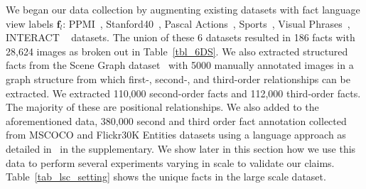 \documentclass[runningheads]{llncs}
\begin{document}
We began our data collection by augmenting existing datasets with fact language view labels $\mathbf{f}_l$: PPMI~\cite{yao2010grouplet}, Stanford40~\cite{yao2011human}, Pascal Actions~\cite{pascal_voc_2012}, Sports~\cite{abhinavg09}, Visual Phrases~\cite{sadeghi2011recognition}, INTERACT ~\cite{antol2014zero} datasets. The union of these 6 datasets resulted in 186 facts with 28,624 images as broken out in Table~\ref{tbl_6DS}. 
We also extracted structured facts from the Scene Graph dataset~\cite{johnson2015image} with 5000 manually annotated images in a graph structure from which first-, second-, and third-order relationships can be extracted. We extracted 110,000 second-order facts and 112,000 third-order facts.  The majority of these are positional relationships. We also added to the aforementioned data,  380,000 second and third order fact annotation  collected from MSCOCO and Flickr30K Entities datasets using a language approach as detailed in~\cite{safa2016_acl} in the supplementary. We show later in this section how we use this data to perform several experiments varying in scale to validate our claims. Table~\ref{tab_lsc_setting} shows the unique facts in the large scale dataset.  
\end{document}
